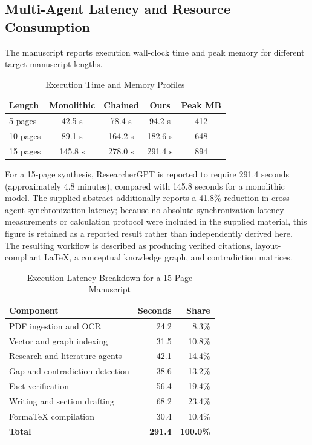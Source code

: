 \documentclass[conference]{IEEEtran}
\begin{document}
\subsection{Multi-Agent Latency and Resource Consumption}
The manuscript reports execution wall-clock time and peak memory for different target manuscript lengths.
\begin{table}[!t]
\caption{Execution Time and Memory Profiles}
\label{tab:latency}
\centering
\footnotesize
\setlength{\tabcolsep}{3pt}
\begin{tabular}{@{}lcccc@{}}
\toprule
\textbf{Length} & \textbf{Monolithic} & \textbf{Chained} & \textbf{Ours} & \textbf{Peak MB}\\
\midrule
5 pages & 42.5 s & 78.4 s & 94.2 s & 412\\
10 pages & 89.1 s & 164.2 s & 182.6 s & 648\\
15 pages & 145.8 s & 278.0 s & 291.4 s & 894\\
\bottomrule
\end{tabular}
\end{table}
For a 15-page synthesis, ResearcherGPT is reported to require 291.4 seconds (approximately 4.8 minutes), compared with 145.8 seconds for a monolithic model. The supplied abstract additionally reports a 41.8\% reduction in cross-agent synchronization latency; because no absolute synchronization-latency measurements or calculation protocol were included in the supplied material, this figure is retained as a reported result rather than independently derived here. The resulting workflow is described as producing verified citations, layout-compliant \LaTeX, a conceptual knowledge graph, and contradiction matrices.
\begin{table}[!t]
\caption{Execution-Latency Breakdown for a 15-Page Manuscript}
\label{tab:latency_breakdown}
\centering
\scriptsize
\begin{tabular}{@{}p{}rr@{}}
\toprule
\textbf{Component} & \textbf{Seconds} & \textbf{Share}\\
\midrule
PDF ingestion and OCR & 24.2 & 8.3\%\\
Vector and graph indexing & 31.5 & 10.8\%\\
Research and literature agents & 42.1 & 14.4\%\\
Gap and contradiction detection & 38.6 & 13.2\%\\
Fact verification & 56.4 & 19.4\%\\
Writing and section drafting & 68.2 & 23.4\%\\
FormaTeX compilation & 30.4 & 10.4\%\\
\midrule
\textbf{Total} & \textbf{291.4} & \textbf{100.0\%}\\
\bottomrule
\end{tabular}
\end{table}
\end{document}
